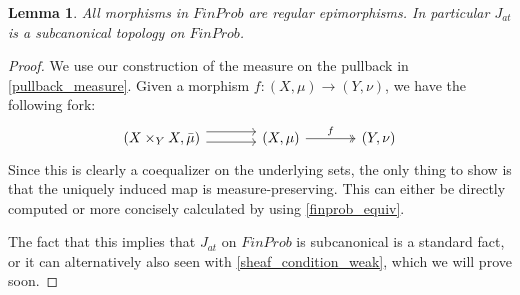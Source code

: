 \documentclass[a4paper]{amsproc}
\theoremstyle{plain}
\newtheorem{theorem}{Theorem}[section]
\newtheorem{lemma}[theorem]{Lemma}
\theoremstyle{definition}
\theoremstyle{remark}
\numberwithin{equation}{section}
\begin{document}
\begin{lemma}\label{subcanonical} All morphisms in $FinProb$ are regular epimorphisms. In particular $J_{at}$ is a subcanonical topology on $FinProb$.
\end{lemma}
\begin{proof}
We use our construction of the measure on the pullback in \ref{pullback_measure}. Given a morphism $f:(X,\mu)\rightarrow (Y, \nu)$, we have the following fork:
\[
\begin{tikzcd}[column sep=large]
(X \times_Y X, \bar{\mu}) \arrow[r, shift left=2] \arrow[r, shift right] & (X,\mu) \arrow[r, "f", two heads] & (Y,\nu)
\end{tikzcd}
\]
Since this is clearly a coequalizer on the underlying sets, the only thing to show is that the uniquely induced map is measure-preserving. This can either be directly computed or more concisely calculated by using \ref{finprob_equiv}.

The fact that this implies that $J_{at}$ on $FinProb$ is subcanonical is a standard fact, or it can alternatively also seen with \ref{sheaf_condition_weak}, which we will prove soon.
\end{proof}
\end{document}
